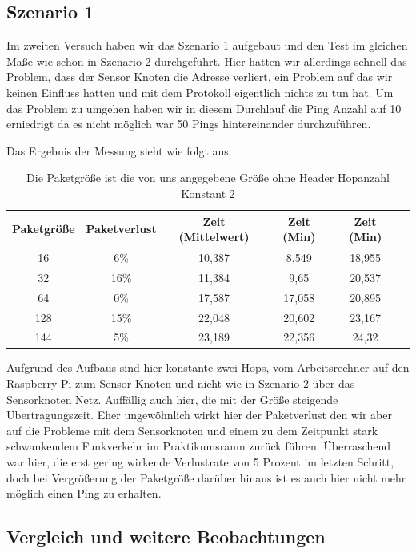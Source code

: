 \documentclass[]{scrartcl}
\begin{document}
\subsection{Szenario 1}

Im zweiten Versuch haben wir das Szenario 1 aufgebaut und den Test im gleichen Maße wie schon in Szenario 2 durchgeführt. Hier hatten wir allerdings schnell das Problem, dass der Sensor Knoten die Adresse verliert, ein Problem auf das wir keinen Einfluss hatten und mit dem Protokoll eigentlich nichts zu tun hat. Um das Problem zu umgehen haben wir in diesem Durchlauf die Ping Anzahl auf 10 erniedrigt da es nicht möglich war 50 Pings hintereinander durchzuführen.

Das Ergebnis der Messung sieht wie folgt aus. 

\begin{table}[H]
\centering
\begin{tabular}{|c|c|c|c|c|c|}
  \hline
  \textbf{Paketgröße} & \textbf{Paketverlust} & \textbf{Zeit (Mittelwert)} & \textbf{Zeit (Min)} & \textbf{Zeit (Min)} \\
  \hline
   16 & 6\% & 10,387 & 8,549 & 18,955\\
  \hline
   32 & 16\% & 11,384 & 9,65 & 20,537\\
  \hline
   64 & 0\% & 17,587 & 17,058 & 20,895\\
  \hline
   128 & 15\% & 22,048 & 20,602 & 23,167\\
  \hline
   144 & 5\% & 23,189 & 22,356 & 24,32\\
  \hline
\end{tabular}
	\caption{Die Paketgröße ist die von uns angegebene Größe ohne Header Hopanzahl Konstant 2}
\end{table}

Aufgrund des Aufbaus sind hier konstante zwei Hops, vom Arbeitsrechner auf den Raspberry Pi zum Sensor Knoten und nicht wie in Szenario 2 über das Sensorknoten Netz. Auffällig auch hier, die mit der Größe steigende Übertragungszeit. Eher ungewöhnlich wirkt hier der Paketverlust den wir aber auf die Probleme mit dem Sensorknoten und einem zu dem Zeitpunkt stark schwankendem Funkverkehr im Praktikumsraum zurück führen. Überraschend war hier, die erst gering wirkende Verlustrate von 5 Prozent im letzten Schritt, doch bei Vergrößerung der Paketgröße darüber hinaus ist es auch hier nicht mehr möglich einen Ping zu erhalten.


\subsection{Vergleich und weitere Beobachtungen}
\end{document}

